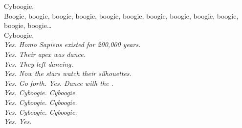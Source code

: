 Cyboogie. \\
Boogie, boogie, boogie, boogie, boogie, boogie, boogie, boogie, boogie, boogie, boogie, boogie… \\
Cyboogie. \\


{\itshape%
Yes. Homo Sapiens existed for 200,000 years. \\
Yes. Their apex was dance. \\
Yes. They left  dancing. \\
Yes. Now the stars watch their silhouettes. \\
Yes. Go forth. Yes. Dance with the . \\
Yes. Cyboogie. Cyboogie. \\
Yes. Cyboogie. Cyboogie. \\
Yes. Cyboogie. Cyboogie. \\
Yes. Yes. \\
}
